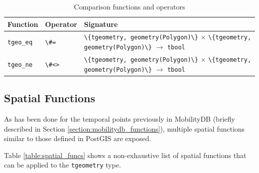 \begin{table}[htb]
    \centering
    \begin{tabularx}{\textwidth}{|l|l|X|}
    \hline
    \textbf{Function}   & \textbf{Operator} & \textbf{Signature} \\
    \hline
    \lstinline+tgeo_eq+    & \lstinline+\#=+   & \lstinline+\{tgeometry, geometry(Polygon)\}+ $\times$ \lstinline+\{tgeometry, geometry(Polygon)\}+ $\rightarrow$ \lstinline+tbool+ \\
    \hline
    \lstinline+tgeo_ne+    & \lstinline+\#<>+  & \lstinline+\{tgeometry, geometry(Polygon)\}+ $\times$ \lstinline+\{tgeometry, geometry(Polygon)\}+ $\rightarrow$ \lstinline+tbool+ \\
    \hline
    \end{tabularx}
    \caption{Comparison functions and operators}
    \label{table:comparison_funcs}
\end{table}

\subsection{Spatial Functions}
\label{section:spatial_funcs}

As has been done for the temporal points previously in MobilityDB (briefly described in Section \ref{section:mobilitydb_functions}), multiple spatial functions similar to those defined in PostGIS are exposed. 

Table \ref{table:spatial_funcs} shows a non-exhaustive list of spatial functions that can be applied to the \lstinline+tgeometry+ type.

